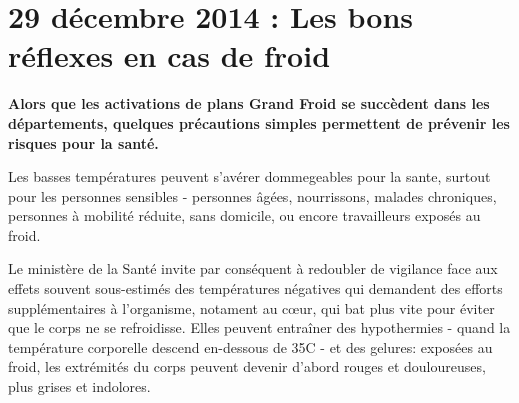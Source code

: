 \documentclass[11pt, french]{report}
\begin{document}
\chapter{29 décembre 2014 : Les bons réflexes en cas de froid}

\textbf{Alors que les activations de plans \og{}Grand Froid \fg{} se succèdent dans
  les départements, quelques précautions simples permettent de prévenir les
risques pour la santé.}

\vfill

Les basses températures peuvent s'avérer dommegeables pour la sante, surtout pour les personnes sensibles - personnes âgées, nourrissons, malades chroniques, personnes à mobilité réduite, sans domicile, ou encore travailleurs exposés au froid.

Le ministère de la Santé invite par conséquent à redoubler de vigilance face aux effets souvent sous-estimés des températures négatives qui demandent des efforts supplémentaires à l'organisme, notament au cœur, qui bat plus vite pour éviter que le corps ne se refroidisse. Elles peuvent entraîner des hypothermies - quand la température corporelle descend en-dessous de 35\textdegree C - et des gelures: exposées au froid, les extrémités du corps peuvent devenir d'abord rouges et douloureuses, plus grises et indolores.
\end{document}
